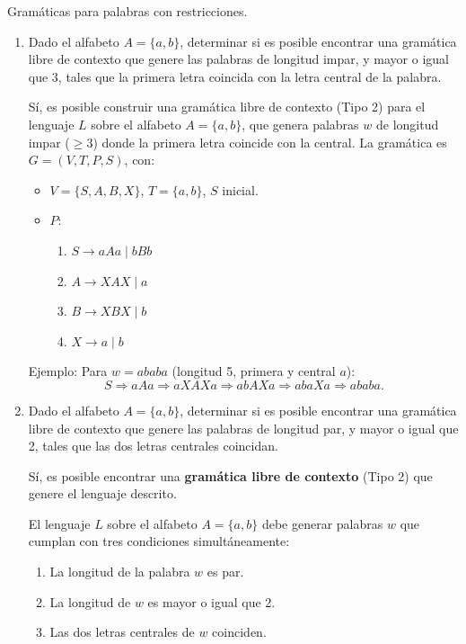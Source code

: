 \documentclass[12pt]{book} %
\begin{document}
\begin{ejercicio}
Gramáticas para palabras con restricciones.

\begin{enumerate}[label=\alph*)]
    \item Dado el alfabeto $A = \{a, b\}$, determinar si es posible encontrar una gramática libre de contexto que genere las palabras de longitud impar, y mayor o igual que 3, tales que la primera letra coincida con la letra central de la palabra.

    \begin{solucion}[a)]
    Sí, es posible construir una gramática libre de contexto (Tipo 2) para el lenguaje \( L \) sobre el alfabeto \( A = \{a, b\} \), que genera palabras \( w \) de longitud impar (\( \geq 3 \)) donde la primera letra coincide con la central. La gramática es \( G = (V, T, P, S) \), con:

    \begin{itemize}
        \item \( V = \{S, A, B, X\} \), \( T = \{a, b\} \), \( S \) inicial.
        \item \( P \):
        \begin{enumerate}
            \item \( S \to aAa \mid bBb \)
            \item \( A \to XAX \mid a \)
            \item \( B \to XBX \mid b \)
            \item \( X \to a \mid b \)
        \end{enumerate}
    \end{itemize}

    Ejemplo: Para \( w = ababa \) (longitud 5, primera y central \( a \)):
    \[
    S \Rightarrow aAa \Rightarrow aXAXa \Rightarrow abAXa \Rightarrow abaXa \Rightarrow ababa.
    \]
    \end{solucion}

    \item Dado el alfabeto $A = \{a, b\}$, determinar si es posible encontrar una gramática libre de contexto que genere las palabras de longitud par, y mayor o igual que 2, tales que las dos letras centrales coincidan.

    \begin{solucion}
    Sí, es posible encontrar una \textbf{gramática libre de contexto} (Tipo 2) que genere el lenguaje descrito.

    El lenguaje \( L \) sobre el alfabeto \( A = \{a, b\} \) debe generar palabras \( w \) que cumplan con tres condiciones simultáneamente:
    \begin{enumerate}
        \item La longitud de la palabra \( w \) es par.
        \item La longitud de \( w \) es mayor o igual que 2.
        \item Las dos letras centrales de \( w \) coinciden.
    \end{enumerate}


\end{solucion}
\end{enumerate}
\end{ejercicio}
\end{document}
